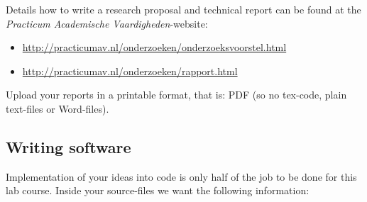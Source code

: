 \documentclass[10pt]{scrartcl}
\begin{document}
Details how to write a research proposal and technical report can be found at the \textit{Practicum Academische Vaardigheden}-website:
\begin{itemize}
\item \url{http://practicumav.nl/onderzoeken/onderzoeksvoorstel.html}
\item \url{http://practicumav.nl/onderzoeken/rapport.html}
\end{itemize}

Upload your reports in a printable format, that is: PDF (so
no tex-code, plain text-files or Word-files).

\subsection{Writing software}
Implementation of your ideas into code is only half of the job to be
done for this lab course. Inside your source-files we want the
following information:
\end{document}
